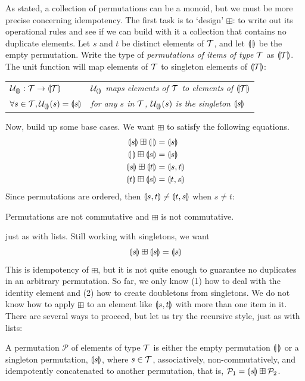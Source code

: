 As stated, a collection of permutations can be a monoid, but we must be more precise concerning idempotency. The first task is to `design' $\boxplus$: to write out its operational rules and see if we can build with it a collection that contains no duplicate elements. Let $s$ and $t$ be distinct elements of $\mathcal{T}$, and let $\llparenthesis\,\rrparenthesis$ be the empty permutation. Write the type of \emph{permutations of items of type $\mathcal{T}$} as $\llparenthesis\mathcal{T}\rrparenthesis$. The unit function will map elements of $\mathcal{T}$ to singleton elements of $\llparenthesis\mathcal{T}\rrparenthesis$:
\begin{center}
\begin{tabular}{ll}
  $\mathcal{U}_{\llparenthesis\rrparenthesis}:\mathcal{T}\rightarrow\llparenthesis\mathcal{T}\rrparenthesis$ &
  \emph{$\mathcal{U}_{\llparenthesis\rrparenthesis}$ maps elements of $\mathcal{T}$ to elements of
  $\llparenthesis\mathcal{T}\rrparenthesis$}\\
  $\forall s \in \mathcal{T}, \mathcal{U}_{\llparenthesis\rrparenthesis}(s)=\llparenthesis s\rrparenthesis$ &
  \emph{for any $s$ in $\mathcal{T}$, $\mathcal{U}_{\llparenthesis\rrparenthesis}(s)$ is the singleton $\llparenthesis s\rrparenthesis$}\\
\end{tabular}
\end{center}


Now, build up some base cases. We want $\boxplus$ to satisfy the following equations.
\begin{align}
  \nonumber
  \llparenthesis s \rrparenthesis \boxplus \llparenthesis\,\rrparenthesis &= \llparenthesis s \rrparenthesis \\
  \nonumber
  \llparenthesis\,\rrparenthesis \boxplus \llparenthesis s \rrparenthesis &= \llparenthesis s \rrparenthesis \\
  \nonumber
  \llparenthesis s \rrparenthesis \boxplus \llparenthesis t \rrparenthesis  &= \llparenthesis s, t \rrparenthesis \\
  \nonumber
  \llparenthesis t \rrparenthesis \boxplus \llparenthesis s \rrparenthesis  &= \llparenthesis t, s \rrparenthesis
\end{align}
Since permutations are ordered, then \mbox{$\llparenthesis s, t \rrparenthesis\neq\llparenthesis t, s \rrparenthesis$} when $s\neq t$:
\begin{observation}
  Permutations are not commutative and $\boxplus$ is not commutative.
\end{observation}
just as with lists. Still working with singletons, we want
\[ \llparenthesis s \rrparenthesis \boxplus \llparenthesis s \rrparenthesis = \llparenthesis s \rrparenthesis \]
This is idempotency of $\boxplus$, but it is not quite enough to guarantee no duplicates in an arbitrary permutation. So far, we only know (1) how to deal with the identity element and (2) how to create doubletons from singletons. We do not know how to apply $\boxplus$ to an element like $\llparenthesis s, t\rrparenthesis$ with more than one item in it. There are several ways to proceed, but let us try the recursive style, just as with lists:
\begin{trial}
  A permutation $\mathcal{P}$ of elements of type $\mathcal{T}$ is either the empty permutation $\llparenthesis\,\rrparenthesis$ or a singleton permutation, $\llparenthesis s\rrparenthesis$, where $s\in\mathcal{T}$, associatively, non-commutatively, and idempotently concatenated to another permutation, that is, \mbox{$\mathcal{P}_1=\llparenthesis s \rrparenthesis\boxplus \mathcal{P}_2$}.
\end{trial}


